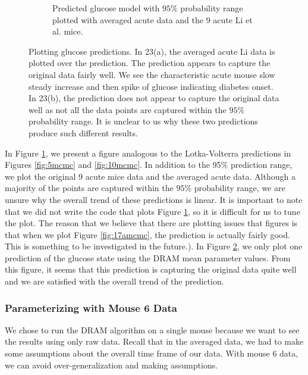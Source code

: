 \begin{figure}[H]
\begin{subfigure}{.7\textwidth}
    \caption{Predicted glucose model with $95\%$ probability range plotted with averaged acute data and the 9 acute Li et al. mice.}
    \label{fig:17bmcmc}
\end{subfigure}
\caption{Plotting glucose predictions. In 23(a), the averaged acute Li data is plotted over the prediction. The prediction appears to capture the original data fairly well. We see the characteristic acute mouse slow steady increase and then spike of glucose indicating diabetes onset. In 23(b), the prediction does not appear to capture the original data well as not all the data points are captured within the $95\%$ probability range. It is unclear to us why these two predictions produce such different results.}
\label{fig:17mcmc}
\end{figure}
In Figure \ref{fig:17bmcmc}, we present a figure analogous to the Lotka-Volterra predictions in Figures \ref{fig:5mcmc} and \ref{fig:10mcmc}. In addition to the 95$\%$ prediction range, we plot the original 9 acute mice data and the averaged acute data. Although a majority of the points are captured within the $95\%$ probability range, we are unsure why the overall trend of these predictions is linear. It is important to note that we did not write the code that plots Figure \ref{fig:17bmcmc}, so it is difficult for us to tune the plot. The reason that we believe that there are plotting issues that figures is that when we plot Figure \ref{fig:17amcmc}, the prediction is actually fairly good. This is something to be investigated in the future.). In Figure \ref{fig:17mcmc}, we only plot one prediction of the glucose state using the DRAM mean parameter values. From this figure, it seems that this prediction is capturing the original data quite well and we are satisfied with the overall trend of the prediction. 

\subsubsection{Parameterizing with Mouse 6 Data}
We chose to run the DRAM algorithm on a single mouse because we want to see the results using only raw data. Recall that in the averaged data, we had to make some assumptions about the overall time frame of our data. With mouse 6 data, we can avoid over-generalization and making assumptions. 
